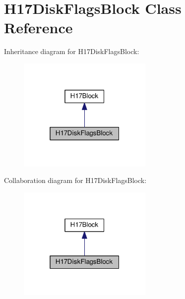 \hypertarget{classH17DiskFlagsBlock}{}\section{H17\+Disk\+Flags\+Block Class Reference}
\label{classH17DiskFlagsBlock}


Inheritance diagram for H17\+Disk\+Flags\+Block\+:
\nopagebreak
\begin{figure}[H]
\begin{center}
\leavevmode
\includegraphics[width=184pt]{classH17DiskFlagsBlock__inherit__graph}
\end{center}
\end{figure}


Collaboration diagram for H17\+Disk\+Flags\+Block\+:
\nopagebreak
\begin{figure}[H]
\begin{center}
\leavevmode
\includegraphics[width=184pt]{classH17DiskFlagsBlock__coll__graph}
\end{center}
\end{figure}
